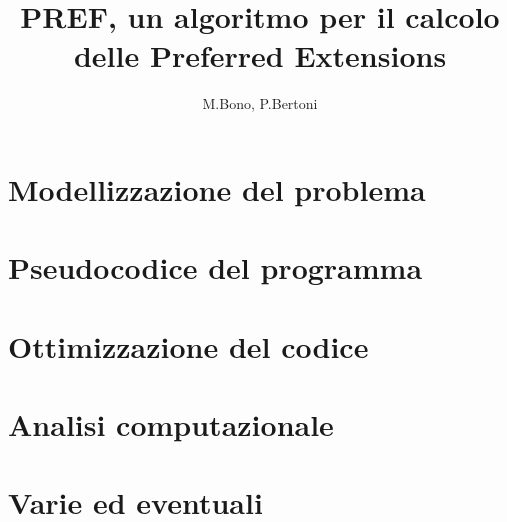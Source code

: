 \documentclass{myReportClass}
\begin{document}
\title{PREF, un algoritmo per il calcolo delle Preferred Extensions}
\author{M.Bono, P.Bertoni}

\maketitle
\tableofcontents

\chapter{Modellizzazione del problema}


\chapter{Pseudocodice del programma}


\chapter{Ottimizzazione del codice} \label{chap:opt}


\chapter{Analisi computazionale}


\chapter{Varie ed eventuali}

\end{document}
